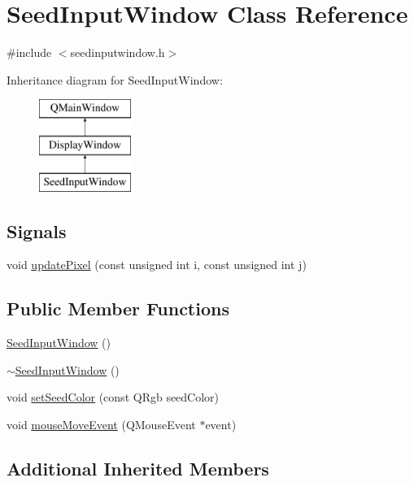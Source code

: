 \hypertarget{classSeedInputWindow}{\section{Seed\-Input\-Window Class Reference}
\label{classSeedInputWindow}
}


{\ttfamily \#include $<$seedinputwindow.\-h$>$}

Inheritance diagram for Seed\-Input\-Window\-:\begin{figure}[H]
\begin{center}
\leavevmode
\includegraphics[height=3.000000cm]{classSeedInputWindow}
\end{center}
\end{figure}
\subsection*{Signals}
\begin{DoxyCompactItemize}
\item 
void \hyperlink{classSeedInputWindow_a71742a7b514dc88ef41db24e8c51043c}{update\-Pixel} (const unsigned int i, const unsigned int j)
\end{DoxyCompactItemize}
\subsection*{Public Member Functions}
\begin{DoxyCompactItemize}
\item 
\hyperlink{classSeedInputWindow_aa61c9965942eff3b348988c35e2375fe}{Seed\-Input\-Window} ()
\item 
\hyperlink{classSeedInputWindow_af6c2f37c19c6755afe654158a6e9baec}{$\sim$\-Seed\-Input\-Window} ()
\item 
void \hyperlink{classSeedInputWindow_a3c534db4845c26958f38651ec0560134}{set\-Seed\-Color} (const Q\-Rgb seed\-Color)
\item 
void \hyperlink{classSeedInputWindow_ac00157b8a7abc95014d1bba6191ae3c3}{mouse\-Move\-Event} (Q\-Mouse\-Event $\ast$event)
\end{DoxyCompactItemize}
\subsection*{Additional Inherited Members}


